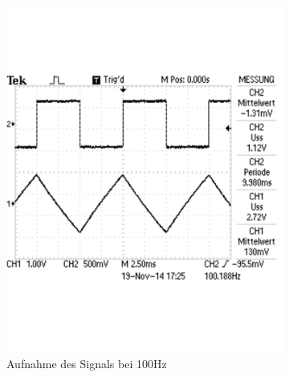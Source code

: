\documentclass[12pt,a4paper]{article}
\begin{document}
\begin{figure}[H]
        \centering
        \begin{subfigure}[b]{0.28\textwidth}
                \includegraphics[width=\textwidth , scale = 0.4]{2_6_recht_100.pdf}
                \caption[Aufnahme des Signals bei 100Hz]{Aufnahme des Signals bei 100Hz}
                \label{fig:2_6_recht_100}
        \end{subfigure}%
        \hfill
        \begin{subfigure}[b]{0.28\textwidth}

\end{subfigure}
\end{figure}
\end{document}
